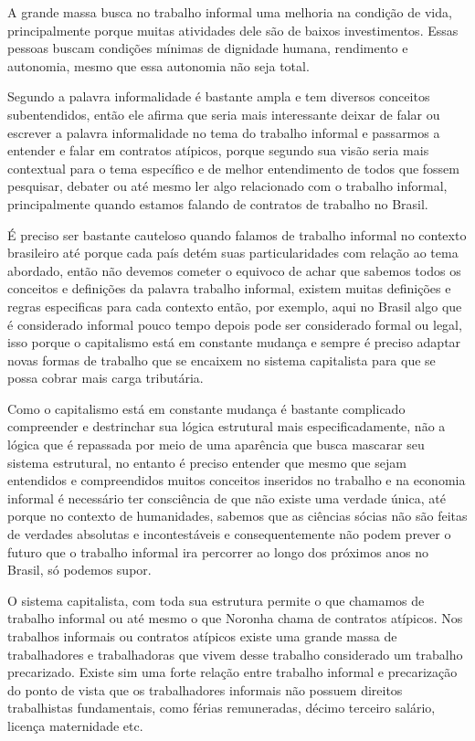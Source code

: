 A grande massa busca no trabalho informal uma melhoria na condição de vida, principalmente porque muitas atividades dele são de baixos investimentos. Essas pessoas buscam condições mínimas de dignidade humana, rendimento e autonomia, mesmo que essa autonomia não seja total.

Segundo \cite{noronha2003informal} a palavra informalidade é bastante ampla e tem diversos conceitos subentendidos, então ele afirma que seria mais interessante deixar de falar ou escrever a palavra informalidade no tema do trabalho informal e passarmos a entender e falar em contratos atípicos, porque segundo sua visão seria mais contextual para o tema específico e de melhor entendimento de todos que fossem pesquisar, debater ou até mesmo ler algo relacionado com o trabalho informal, principalmente quando estamos falando de contratos de trabalho no Brasil.

É preciso ser bastante cauteloso quando falamos de trabalho informal no contexto brasileiro até porque cada país detém suas particularidades com relação ao tema abordado, então não devemos cometer o equivoco de achar que sabemos todos os conceitos e definições da palavra trabalho informal, existem muitas definições e regras especificas para cada contexto então, por exemplo, aqui no Brasil algo que é considerado informal pouco tempo depois pode ser considerado formal ou legal, isso porque o capitalismo está em constante mudança e sempre é preciso adaptar novas formas de trabalho que se encaixem no sistema capitalista para que se possa cobrar mais carga tributária.

Como o capitalismo está em constante mudança é bastante complicado compreender e destrinchar sua lógica estrutural mais especificadamente, não a lógica que é repassada por meio de uma aparência que busca mascarar seu sistema estrutural, no entanto é preciso entender que mesmo que sejam entendidos e compreendidos muitos conceitos inseridos no trabalho e na economia informal é necessário ter consciência de que não existe uma verdade única, até porque no contexto de humanidades, sabemos que as ciências sócias não são feitas de verdades absolutas e incontestáveis e consequentemente não podem prever o futuro que o trabalho informal ira percorrer ao longo dos próximos anos no Brasil, só podemos supor.

O sistema capitalista, com toda sua estrutura permite o que chamamos de trabalho informal ou até mesmo o que Noronha chama de contratos atípicos. Nos trabalhos informais ou contratos atípicos existe uma grande massa de trabalhadores e trabalhadoras que vivem desse trabalho considerado um trabalho precarizado. Existe sim uma forte relação entre trabalho informal e precarização do ponto de vista que os trabalhadores informais não possuem direitos trabalhistas fundamentais, como férias remuneradas, décimo terceiro salário, licença maternidade etc. 

